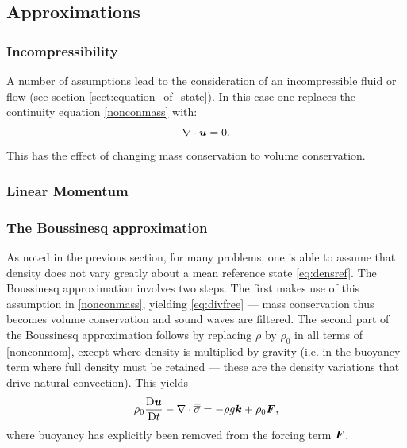 \subsection{Approximations}

\subsubsection{Incompressibility} \label{sect:incompressibility}
A number of assumptions lead to the consideration of an incompressible fluid or flow (see section \ref{sect:equation_of_state}). In this case one replaces the continuity equation \eqref{nonconmass} with:
\begin{equation}\label{eq:divfree}
\nabla\cdot{\mbox{\boldmath$u$}}=0.
\end{equation}
This has the effect of changing mass conservation to volume conservation.

\subsubsection{Linear Momentum}


\subsubsection{The Boussinesq approximation} \label{sect:boussinesq_approximation}
As noted in the previous section, for many problems, one is able to assume that density does not vary greatly about a mean reference state \eqref{eq:densref}. The Boussinesq approximation involves two steps. The first makes use of this assumption in \eqref{nonconmass}, yielding \eqref{eq:divfree} --- mass conservation thus becomes volume conservation and sound waves are filtered. The second part of the Boussinesq approximation follows by replacing $\rho$ by $\rho_0$ in all terms of \eqref{nonconmom}, except where density is multiplied by gravity (i.e. in the buoyancy term where full density must be retained --- these are the density variations that drive natural convection). This yields
\begin{equation}
\rho_0\frac{\mathrm{D}{\mbox{\boldmath$u$}}}{\mathrm{D} t} -\nabla\cdot\overline{\overline{\sigma}} = -\rho g{\mbox{\boldmath$k$}} +
\rho_0{\mbox{\boldmath$F$}},
\end{equation}
where buoyancy has explicitly been removed from the forcing term ${\mbox{\boldmath$F$}}$.

